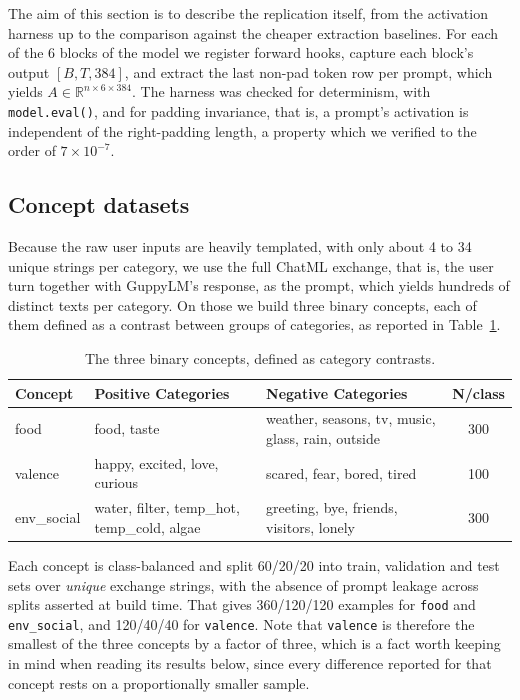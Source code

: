 The aim of this section is to describe the replication itself, from the activation harness
up to the comparison against the cheaper extraction baselines. For each of the 6 blocks of
the model we register forward hooks, capture each block's output $[B, T, 384]$, and
extract the last non-pad token row per prompt, which yields
$A \in \mathbb{R}^{n \times 6 \times384}$. The harness was checked for determinism, with
\verb|model.eval()|, and for padding invariance, that is, a prompt's activation is
independent of the right-padding length, a property which we verified to the order of
$7\times 10^{-7}$.

\subsection{Concept datasets}

Because the raw user inputs are heavily templated, with only about 4 to 34 unique strings
per category, we use the full ChatML exchange, that is, the user turn together with
GuppyLM's response, as the prompt, which yields hundreds of distinct texts per category.
On those we build three binary concepts, each of them defined as a contrast between groups
of categories, as reported in Table~\ref{tab:concept_categories}.


\begin{table}[htbp]
\centering
\caption{The three binary concepts, defined as category contrasts.}
\label{tab:concept_categories}
\begin{tabular}{@{}l p{4.2cm} p{4.6cm} c@{}}
\toprule
\textbf{Concept}& \textbf{Positive Categories} & \textbf{Negative Categories} & \textbf{N/class} \\
\midrule
food &  food, taste & weather, seasons, tv, music, glass, rain, outside & 300 \\
valence &  happy, excited, love, curious & scared, fear, bored, tired & 100 \\
env\_social &  water, filter, temp\_hot, temp\_cold, algae & greeting, bye, friends, visitors, lonely & 300 \\
\bottomrule
\end{tabular}
\end{table}

Each concept is class-balanced and split 60/20/20 into train, validation and test sets
over \emph{unique} exchange strings, with the absence of prompt leakage across splits
asserted at build time. That gives 360/120/120 examples for \verb|food| and
\verb|env_social|, and 120/40/40 for \verb|valence|. Note that \verb|valence| is therefore
the smallest of the three concepts by a factor of three, which is a fact worth keeping in
mind when reading its results below, since every difference reported for that concept
rests on a proportionally smaller sample.

